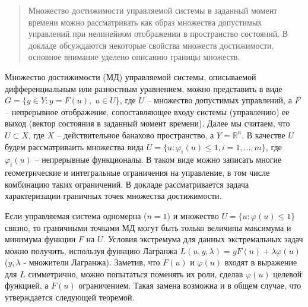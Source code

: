 \begin{abstract}
Множество достижимости управляемой системы  в заданный момент времени можно рассматривать как образ множества допустимых управлений при нелинейном отображении в пространство состояний.  В докладе обсуждаются некоторые свойства множеств достижимости, основное внимание уделено описанию границы множеств.

\end{abstract}





Множество достижимости (МД)  управляемой системы, описываемой дифференциальным  или  разностным уравнением,  можно  представить  в виде
 $G=\big\{y \in Y: y=F(u),\; u \in U \big\}$, где $U$ -- множество допустимых управлений, а $F$ -- непрерывное отображение, сопоставляющее  входу системы (управлению)  ее выход (вектор состояния в заданный момент времени).  Далее мы считаем, что  $U\subset X$, где $X$ -- действительное банахово пространство, а $Y=\mathbb R^n$.  В качестве $U$ будем рассматриваить множества вида $U=\{u:\varphi_i(u)\leq 1, i=1,...,m\}$, где $\varphi_i(u)$ -- непрерывные функционалы.  В таком виде можно записать многие геометрические и интегральные ограничения на управление, в том числе комбинацию таких ограничений.  В докладе рассматривается  задача характеризации граничных точек множества достижимости.

  Если управляемая система одномерна ($n=1$)  и множество $U= \{u:\varphi(u)\leq 1\}$  связно, то граничными точками МД могут быть  только величины максимума и минимума функции $F$ на $U$.  Условия экстремума для данных экстремальных задач  можно получить, используя функцию  Лагранжа $L(u, y, \lambda)=y F(u) +\lambda \varphi(u)$ ($y,\lambda$ - множители Лагранжа). Заметив, что $F(u)$ и $\varphi(u)$ входят в выражение для $L$ симметрично, можно попытаться поменять их роли, сделав $\varphi(u)$ целевой функцией, а $F(u)$ ограничением. Такая замена возможна и в общем случае, что утверждается следующей теоремой.

